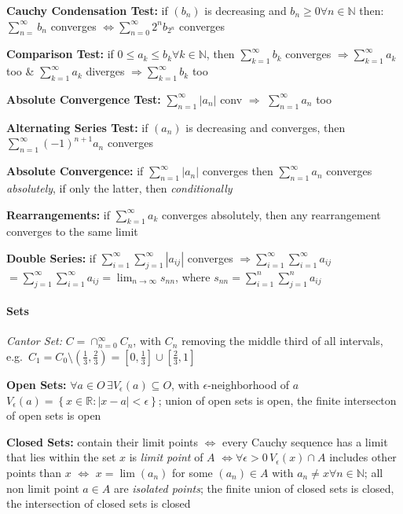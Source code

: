 \documentclass[8pt,twoside]{extarticle}
\begin{document}
\begin{multicols}{2}
 \textbf{Cauchy Condensation Test:} if $(b_n)$ is decreasing and $b_n\geq 0\forall n\in \mathbb{N}$ then: $\sum_{n=}^\infty b_n$ converges $\Leftrightarrow \sum_{n=0}^\infty 2^nb_{2^n}$ converges


 \textbf{Comparison Test:} if $0\leq a_k \leq b_k \forall k\in \mathbb{N}$, then $\sum_{k=1}^\infty b_k$ converges $\Rightarrow \sum_{k=1}^\infty a_k$ too \& $\sum_{k=1}^\infty a_k$ diverges $\Rightarrow \sum_{k=1}^\infty b_k$ too

 \textbf{Absolute Convergence Test:} 
$\sum_{n=1}^\infty |a_n|$ conv $\Rightarrow$ $\sum_{n=1}^\infty a_n$ too

 \textbf{Alternating Series Test:} if $(a_n)$ is decreasing and converges, then $\sum_{n=1}^\infty (-1)^{n+1}a_n$ converges

 \textbf{Absolute Convergence:} if $\sum_{n=1}^\infty |a_n|$ converges then $\sum_{n=1}^\infty a_n$ converges \textit{absolutely}, if only the latter, then \textit{conditionally}

 \textbf{Rearrangements:} if $\sum_{k=1}^\infty a_k$ converges absolutely, then any rearrangement converges to the same limit

 \textbf{Double Series:} if $\sum_{i=1}^\infty\sum_{j=1}^\infty |a_{ij}|$ converges 
$\Rightarrow \sum_{i=1}^\infty\sum_{i=1}^\infty a_{ij} $ 
$= \sum_{j=1}^\infty\sum_{i=1}^\infty a_{ij} = \lim_{n\to\infty} s_{nn}$, 
where $s_{nn} = \sum_{i=1}^n\sum_{j=1}^n a_{ij}$


\paragraph{Sets}

 \textit{Cantor Set:} $C=\cap_{n=0}^\infty C_n$, with $C_n$ removing the middle third of all intervals, e.g.\ $C_1 = C_0\setminus(\frac{1}{3}, \frac{2}{3})=\left[0,\frac{1}{3}\right]\cup \left[\frac{2}{3},1\right]$

 \textbf{Open Sets:} $\forall a\in O\,\exists V_\epsilon(a)\subseteq O$,
 with $\epsilon$-neighborhood of $a$ $V_\epsilon(a)=\left\{x\in\mathbb{R}:|x-a|<\epsilon\right\}$; union of open sets is open, the finite intersecton of open sets is open
 
  \textbf{Closed Sets:} contain their limit points $\Leftrightarrow$ every Cauchy sequence has a limit that lies within the set \newline
 $x$ is \textit{limit point} of $A$ $\Leftrightarrow \forall \epsilon>0 \, V_\epsilon(x)\cap A$ includes other points than $x$ $\Leftrightarrow$ $x=\lim(a_n)$ for some $(a_n)\in A$ with $a_n\neq x \forall n\in \mathbb{N}$; \newline
  all non limit point $a\in A$ are \textit{isolated points}; the finite union of closed sets is closed, the intersection of closed sets is closed
  

\end{multicols}
\end{document}
